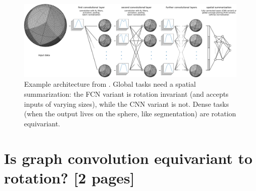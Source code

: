 \documentclass{article} %
\renewcommand{\b}[1]{{\bm{#1}}}   %
\newcommand{\nati}[1]{{\color[rgb]{.3,.5,.9}{#1}}}
\begin{document}
\begin{figure}
	\centering
	\includegraphics[width=0.9\linewidth]{figure_architecture_v3}
	\caption{Example architecture from \cite{perraudin2019deepspherecosmo}.
		Global tasks need a spatial summarization: the FCN variant is rotation invariant (and accepts inputs of varying sizes), while the CNN variant is not.
		Dense tasks (when the output lives on the sphere, like segmentation) are rotation equivariant.
	}
	\label{fig:architecture}
\end{figure}


\section{Is graph convolution equivariant to rotation? [2 pages]}
\end{document}
